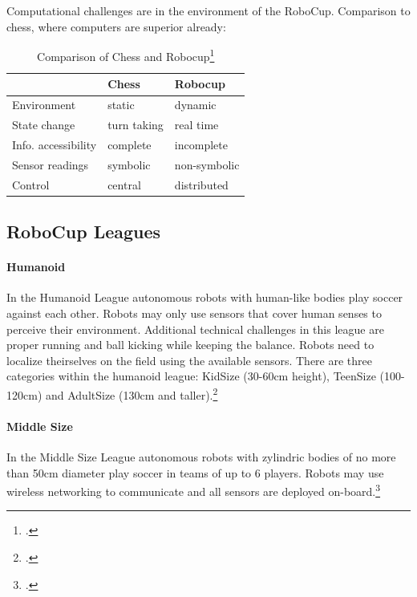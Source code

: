 Computational challenges are in the environment of the RoboCup.
Comparison to chess, where computers are superior already:

\begin{table}[htbp]
\centering
\begin{savenotes}
\begin{tabular*}{0.7\textwidth}{p{} p{} p{}}
\toprule
                    &\textbf{Chess} & \textbf{Robocup} \\
\midrule 
Environment         & static		& dynamic \\
State change        & turn taking   & real time \\
Info. accessibility & complete      & incomplete \\
Sensor readings     & symbolic      & non-symbolic \\
Control             & central       & distributed \\
\bottomrule 
\end{tabular*}
  \caption[Comparison of Chess and Robocup]{Comparison of Chess and Robocup\footcite[][]{robo_objectives}}
  \label{tab:chess_comparison}
\end{savenotes}
\end{table}

\subsection{RoboCup Leagues \label{sec:robo-leagues}}


\paragraph{Humanoid}
In the Humanoid League autonomous robots with human-like bodies play soccer
against each other.
Robots may only use sensors that cover human senses to perceive their
environment. Additional technical challenges in this league are proper running and ball
kicking while keeping the balance. Robots need to localize theirselves on the
field using the available sensors.
There are three categories within the humanoid league: KidSize (30-60cm height),
TeenSize (100-120cm) and AdultSize (130cm and taller).\footcite[Cf.][]{robo_humanoid_wiki}
 
\paragraph{Middle Size}
In the Middle Size League autonomous robots with zylindric bodies of no more
than 50cm diameter play soccer in teams of up to 6 players. Robots may use
wireless networking to communicate and all sensors are deployed on-board.\footcite[Cf.][]{robo_ms}
 
